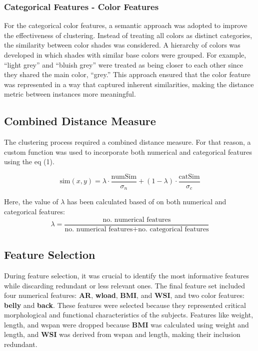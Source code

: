\subsubsection{Categorical Features - Color Features}
For the categorical color features, a semantic approach was adopted to improve the effectiveness of clustering. Instead of treating all colors as distinct categories, the similarity between color shades was considered. A hierarchy of colors was developed in which shades with similar base colors were grouped. For example, ``light grey'' and ``bluish grey'' were treated as being closer to each other since they shared the main color, ``grey.'' This approach ensured that the color feature was represented in a way that captured inherent similarities, making the distance metric between instances more meaningful.



\subsection{Combined Distance Measure}
The clustering process required a combined distance measure. For that reason, a custom function was used to incorporate both numerical and categorical features using the eq (1).

\begin{equation}
    \text{sim}(x, y) = \lambda \cdot \frac{\text{numSim}}{\sigma_n} + (1 - \lambda) \cdot \frac{\text{catSim}}{\sigma_c}
    \label{eq:1}
\end{equation}

Here, the value of $\lambda$ has been calculated based of on both numerical and categorical features: 
\begin{equation}
    \lambda = \frac{\text{no. numerical features}}{\text{no. numerical features} + \text{no. categorical features}}
\end{equation}



\subsection{Feature Selection}
During feature selection, it was crucial to identify the most informative features while discarding redundant or less relevant ones. The final feature set included four numerical features: \textbf{AR}, \textbf{wload}, \textbf{BMI}, and \textbf{WSI}, and two color features: \textbf{belly} and \textbf{back}. These features were selected because they represented critical morphological and functional characteristics of the subjects. Features like weight, length, and wspan were dropped because \textbf{BMI} was calculated using weight and length, and \textbf{WSI} was derived from wspan and length, making their inclusion redundant.


